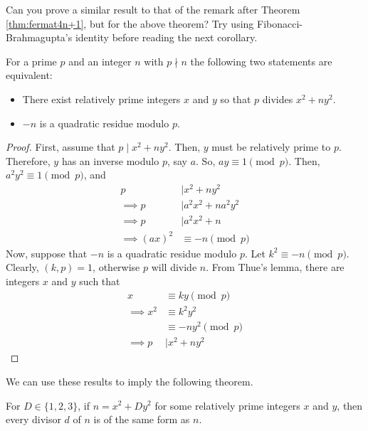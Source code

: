 \documentclass{subfile}
\begin{document}
	\begin{question}
		Can you prove a similar result to that of the remark after Theorem \autoref{thm:fermat4n+1}, but for the above theorem? Try using Fibonacci-Brahmagupta's identity before reading the next corollary.
	\end{question}

	\begin{corollary}\label{cor:p|x^2+ny^2}
		For a prime $p$ and an integer $n$ with $p \nmid n$ the following two statements are equivalent:
		\begin{itemize}
			\item There exist relatively prime integers $x$ and $y$ so that $p$ divides $x^2+ny^2$.
			\item $-n$ is a quadratic residue modulo $p$.
		\end{itemize}
	\end{corollary}

	\begin{proof}
		First, assume that $p\mid x^2+ny^2$. Then, $y$ must be relatively prime to $p$. Therefore, $y$ has an inverse modulo $p$, say $a$. So, $ay\equiv1\pmod p$. Then, $a^2y^2  \equiv1\pmod p$, and
		\begin{align*}
			p
				& \mid x^2 + ny^2\\
			\implies p
				& \mid a^2x^2+na^2y^2\\
			\implies p
				& \mid a^2x^2+n\\
			\implies (ax)^2
				& \equiv-n\pmod p
		\end{align*}
		Now, suppose that $-n$ is a quadratic residue modulo $p$. Let $k^2\equiv-n\pmod p$. Clearly, $(k,p)=1$, otherwise $p$ will divide $n$. From Thue's lemma, there are integers $x$ and $y$ such that
		\begin{align*}
			x
				& \equiv ky\pmod p\\
			\implies x^2
				& \equiv k^2y^2\\
				& \equiv-ny^2\pmod p\\
			\implies  p
				& \mid x^2+ny^2
		\end{align*}
	\end{proof}
	We can use these results to imply the following theorem.
	\begin{theorem}
		For $D\in\{1,2,3\}$, if $n=x^2+Dy^2$ for some relatively prime integers $x$ and $y$, then every divisor $d$ of $n$ is of the same form as $n$.
	\end{theorem}
\end{document}
